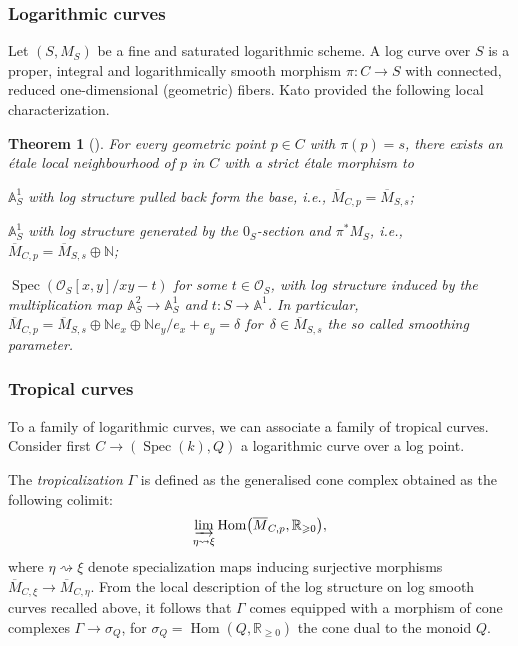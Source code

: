 \documentclass[pdftex]{sigma}
\newcommand{\RR}{\mathbb{R}}
\renewcommand{\geq}{\geqslant}
\numberwithin{equation}{section}
\newtheorem{theo}{Theorem}[section]
\theoremstyle{definition}
\begin{document}
\subsubsection{Logarithmic curves}
Let $(S,M_S)$ be a fine and saturated logarithmic scheme. A log curve over $S$ is a proper, integral and logarithmically smooth morphism $\pi\colon C\to S$ with connected, reduced one-dimensional (geometric) fibers.
Kato provided the following local characterization.
\begin{theo}[\cite{KatoF}]
For every geometric point $p\in C$ with $\pi(p)=s$, there exists an \'etale local neighbourhood of $p$ in $C$ with a strict \'etale morphism to
\begin{description}\itemsep=0pt
 \item[\emph{smooth point:}] $\mathbb A^1_S$ with log structure pulled back form the base, i.e., $\overline{M}_{C,p}=\overline M_{S,s}$;
 \item[\emph{marking:}] $\mathbb A^1_S$ with log structure generated by the $0_S$-section and $\pi^*M_S$, i.e., $\overline{M}_{C,p}=\overline M_{S,s}\oplus \mathbb N$;
 \item[\emph{node:}] $\operatorname{Spec}(\mathcal O_S[x,y]/xy-t)$ for some $t\in\mathcal O_S$, with log structure induced by the multiplication map $\mathbb A^2_S\to\mathbb A^1_S$ and $t\colon S\to \mathbb A^1$. In particular, $\overline{M}_{C,p}=\overline M_{S,s}\oplus \mathbb N e_x\oplus \mathbb N e_y\slash e_x+e_y=\delta$ for~${\delta\in \overline{M}_{S,s}}$ the so called \emph{smoothing parameter}.
\end{description}
\end{theo}

\subsubsection{Tropical curves}

To a family of logarithmic curves, we can associate a family of tropical curves.
Consider first $C\to (\operatorname{Spec}(k),Q)$ a logarithmic curve over a log point.

The \emph{tropicalization} $\Gamma$ is defined as the generalised cone complex obtained as the following colimit:
\[
\varinjlim_{\eta\rightsquigarrow\xi} \operatorname{Hom}\bigl(\overline{M}_{C,p},\mathbb R_{\geq 0}\bigr),
\]
where $\eta\rightsquigarrow\xi$ denote specialization maps inducing surjective morphisms $\overline{M}_{C,\xi}\to\overline{M}_{C,\eta}$. From the local description of the log structure on log smooth curves recalled above, it follows that $\Gamma$ comes equipped with a morphism of cone complexes
$\Gamma\to\sigma_Q $,
for $\sigma_Q=\operatorname{Hom}(Q,\RR_{\geqslant 0})$ the cone dual to the monoid $Q$.
\end{document}
